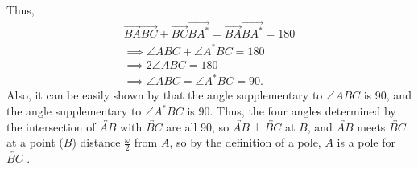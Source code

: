 \documentclass{report}
\begin{document}
    Thus,
    \begin{align*}
        \overrightarrow{BA}\overrightarrow{BC} + \overrightarrow{BC}\overrightarrow{BA^{*}} = \overrightarrow{BA}\overrightarrow{BA^{*}} = 180 \\
        \implies \angle ABC + \angle A^{*}BC = 180 \\
        \implies 2\angle ABC = 180 \\
        \implies \angle ABC  = \angle A^{*}BC= 90
    .\end{align*}
    Also, it can be easily shown by that the angle supplementary to $\angle ABC$ is 90, and the angle supplementary to $\angle A^{*}BC$ is 90. Thus, the four angles determined by the intersection of $\overleftrightarrow{AB}$ with $\overleftrightarrow{BC}$ are all 90, so $\overleftrightarrow{AB} \perp \overleftrightarrow{BC}$ at $B$, and $\overleftrightarrow{AB}$ meets $ \overleftrightarrow{BC}$ at a point ($B$) distance $\frac{\omega}{2}$ from $A$, so by the definition of a pole, $A$ is a pole for $ \overleftrightarrow{BC}$ \endpf.
\end{document}

